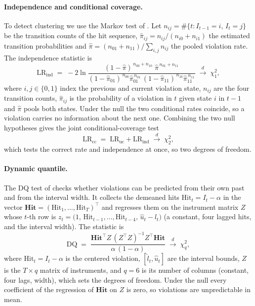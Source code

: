\paragraph{Independence and conditional coverage.}
To detect clustering we use the Markov test of \textcite{christoffersen1998}.
Let $n_{ij}=\#\{t: I_{t-1}=i,\,I_t=j\}$ be the transition counts of the hit
sequence, $\hat{\pi}_{ij}=n_{ij}/(n_{i0}+n_{i1})$ the estimated transition
probabilities and $\hat{\pi}=(n_{01}+n_{11})/\!\sum_{i,j} n_{ij}$ the pooled
violation rate. The independence statistic is
\begin{equation}
  \mathrm{LR}_{\mathrm{ind}} \;=\;
  -2\ln\!\frac{(1-\hat{\pi})^{\,n_{00}+n_{10}}\;\hat{\pi}^{\,n_{01}+n_{11}}}
              {(1-\hat{\pi}_{01})^{\,n_{00}}\hat{\pi}_{01}^{\,n_{01}}\,
               (1-\hat{\pi}_{11})^{\,n_{10}}\hat{\pi}_{11}^{\,n_{11}}}
  \;\xrightarrow{d}\; \chi^2_{1},
  \label{eq:christ_ind}
\end{equation}
where $i,j\in\{0,1\}$ index the previous and current violation state, $n_{ij}$
are the four transition counts, $\hat{\pi}_{ij}$ is the probability of a
violation in $t$ given state $i$ in $t-1$ and $\hat{\pi}$ pools both states.
Under the null the two conditional rates coincide, so a violation carries no
information about the next one. Combining the two null hypotheses gives the
joint conditional-coverage test
\begin{equation}
  \mathrm{LR}_{\mathrm{cc}} \;=\;
  \mathrm{LR}_{\mathrm{uc}} + \mathrm{LR}_{\mathrm{ind}}
  \;\xrightarrow{d}\; \chi^2_{2},
  \label{eq:christ_cc}
\end{equation}
which tests the correct rate and independence at once, so two degrees of
freedom.
\paragraph{Dynamic quantile.}
The DQ test of \textcite{engle2004caviar} checks whether violations can be
predicted from their own past and from the interval width. It collects the demeaned
hits $\mathrm{Hit}_t = I_t - \alpha$ in the vector
$\mathbf{Hit}=(\mathrm{Hit}_1,\dots,\mathrm{Hit}_T)^{\!\top}$ and regresses them on
the instrument matrix $Z$ whose $t$-th row is
$z_t=\big(1,\,\mathrm{Hit}_{t-1},\dots,\mathrm{Hit}_{t-4},\,\hat{u}_t-\hat{l}_t\big)$
(a constant, four lagged hits, and the interval width). The statistic is
\begin{equation}
  \mathrm{DQ} \;=\;
  \frac{\mathbf{Hit}^{\!\top} Z\,(Z^{\!\top} Z)^{-1} Z^{\!\top}\mathbf{Hit}}
       {\alpha\,(1-\alpha)}
  \;\xrightarrow{d}\; \chi^2_{q},
  \label{eq:dq}
\end{equation}
where $\mathrm{Hit}_t=I_t-\alpha$ is the centered violation, $[\hat{l}_t,\hat{u}_t]$
are the interval bounds, $Z$ is the $T\times q$ matrix of instruments, and
$q=6$ is its number of columns (constant, four lags, width), which sets the
degrees of freedom. Under the null every coefficient of the regression of
$\mathbf{Hit}$ on $Z$ is zero, so violations are unpredictable in mean.
